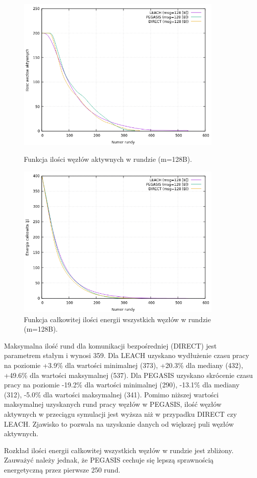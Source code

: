 \documentclass[a4paper,12pt,twoside,openany]{report}
\begin{document}
\begin{figure}[H]
 \centering
 \includegraphics[width=10cm]{images/gnuplot/test_1/nodes_in_round_m128.png}
 \caption{Funkcja ilości węzłów aktywnych w rundzie (m=128B).}
 \includegraphics[width=10cm]{images/gnuplot/test_1/energy_in_round_m128.png}
 \caption{Funkcja całkowitej ilości energii wszystkich węzłów w rundzie (m=128B).}
\end{figure}

\par
Maksymalna ilość rund dla komunikacji bezpośredniej (DIRECT) jest parametrem stałym i wynosi 359.
Dla LEACH uzyskano wydłużenie czasu pracy na poziomie +3.9\% dla wartości minimalnej (373), +20.3\% dla mediany (432), +49.6\% dla wartości maksymalnej (537).
Dla PEGASIS uzyskano skrócenie czasu pracy na poziomie -19.2\% dla wartości minimalnej (290), -13.1\% dla mediany (312), -5.0\% dla wartości maksymalnej (341).
Pomimo niższej wartości maksymalnej uzyskanych rund pracy węzłów w PEGASIS, ilość węzłów aktywnych w przeciągu symulacji jest wyższa niż w przypadku DIRECT czy LEACH.
Zjawisko to pozwala na uzyskanie danych od większej puli węzłów aktywnych.
\par
Rozkład ilości energii całkowitej wszystkich węzłów w rundzie jest zbliżony.
Zauważyć należy jednak, że PEGASIS cechuje się lepszą sprawnością energetyczną przez pierwsze 250 rund.
\end{document}
